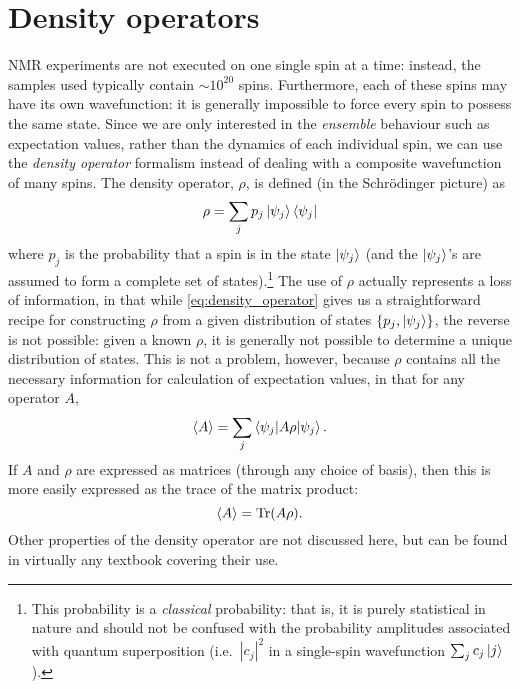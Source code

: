 \section{Density operators}
\label{sec:theory__density_operators}

NMR experiments are not executed on one single spin at a time: instead, the samples used typically contain $\sim 10^{20}$ spins.
Furthermore, each of these spins may have its own wavefunction: it is generally impossible to force every spin to possess the same state.
Since we are only interested in the \textit{ensemble} behaviour such as expectation values, rather than the dynamics of each individual spin, we can use the \textit{density operator} formalism instead of dealing with a composite wavefunction of many spins.
The density operator, $\rho$, is defined (in the Schr\"odinger picture) as
\begin{equation}
    \label{eq:density_operator}
    \rho = \sum_j p_j \ket{\psi_j}\bra{\psi_j}
\end{equation}
where $p_j$ is the probability that a spin is in the state $\ket{\psi_j}$ (and the $\ket{\psi_j}$'s are assumed to form a complete set of states).\footnote{This probability is a \textit{classical} probability: that is, it is purely statistical in nature and should not be confused with the probability amplitudes associated with quantum superposition (i.e.\ $|c_j|^2$ in a single-spin wavefunction $\sum_j c_j \ket{j}$).}
The use of $\rho$ actually represents a loss of information, in that while \cref{eq:density_operator} gives us a straightforward recipe for constructing $\rho$ from a given distribution of states $\{p_j, \ket{\psi_j}\}$, the reverse is not possible: given a known $\rho$, it is generally not possible to determine a unique distribution of states.
This is not a problem, however, because $\rho$ contains all the necessary information for calculation of expectation values, in that for any operator $A$,
\begin{equation}
    \label{eq:density_expectation}
    \langle A \rangle = \sum_j \braket{\psi_j | A\rho | \psi_j}.
\end{equation}
If $A$ and $\rho$ are expressed as matrices (through any choice of basis), then this is more easily expressed as the trace of the matrix product:
\begin{equation}
    \label{eq:density_trace}
    \langle A \rangle = \operatorname{Tr}(A\rho).
\end{equation}
Other properties of the density operator are not discussed here, but can be found in virtually any textbook covering their use.\autocite{Blum2012,CohenTannoudji2020,Sakurai2021}


